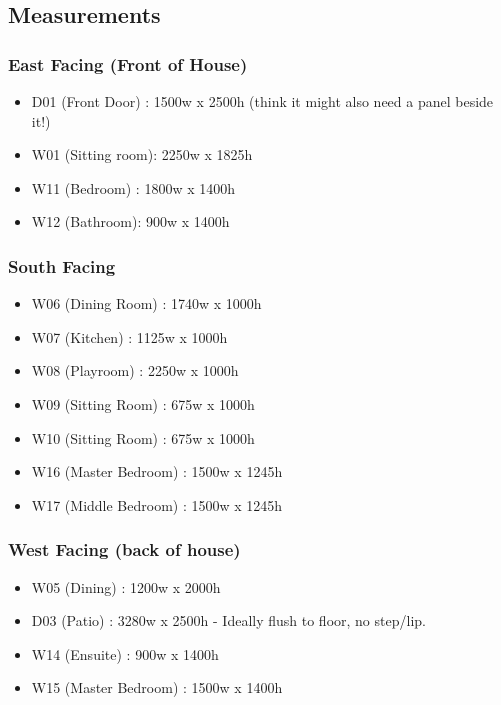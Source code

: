 \newcommand\B[1]{\textbf{#1}}

\subsection{Measurements}
\subsubsection{East Facing (Front of House)}
\begin{itemize}
\item D01 (Front Door) : 1500w x 2500h (think it might also need a panel beside it!)
\item W01 (Sitting room): 2250w x 1825h
\item W11 (Bedroom) : 1800w x 1400h
\item W12 (Bathroom): 900w x 1400h
\end{itemize}    
    
\subsubsection{South Facing}
\begin{itemize}
\item W06 (Dining Room) : 1740w x 1000h
\item W07 (Kitchen) : 1125w x 1000h
\item W08 (Playroom) : 2250w x 1000h
\item W09 (Sitting Room) : 675w x 1000h
\item W10 (Sitting Room) : 675w x 1000h
\item W16 (Master Bedroom) : 1500w x 1245h
\item W17 (Middle Bedroom) : 1500w x 1245h
\end{itemize}

\subsubsection{West Facing (back of house)}
\begin{itemize}
\item W05 (Dining) : 1200w x 2000h
\item D03 (Patio) : 3280w x 2500h  - Ideally flush to floor, no step/lip.
\item W14 (Ensuite) : 900w x 1400h
\item W15 (Master Bedroom) : 1500w x 1400h    
\end{itemize}

